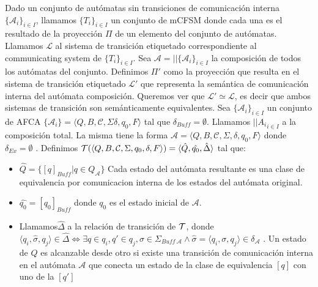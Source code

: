 \begin{definition}
Dado un conjunto de autómatas sin transiciones de comunicación interna $\{ \mathcal{A}_i\}_{i \in I}$, llamamos $\{T_i\}_{i \in I}$ un conjunto de mCFSM donde cada una es el resultado de la proyección $\Pi$ de un elemento del conjunto de autómatas. Llamamos $\mathcal{L}$ al sistema de transición etiquetado correspondiente al communicating system de $\{T_i\}_{i \in I}$. Sea $\mathcal{A} = || \{ \mathcal{A}_i\}_{i \in I}$ la composición de todos los autómatas del conjunto. Definimos $\Pi'$ como la proyección que resulta en el sistema de transición etiquetado $\mathcal{L}'$ que representa la semántica de comunicación interna del autómata composición.  Queremos ver que $\mathcal{L}' \simeq \mathcal{L}$, es decir que ambos sistemas de transición son semánticamente equivalentes.
Sea $\{ \mathcal{A}_i \}_{i \in I}$ un conjunto de AFCA $\{ \mathcal{A}_i \} = \langle Q, B, \mathcal{C}, \Sigma \delta, q_0, F \rangle$ tal que $\delta_{Buff} =  \emptyset$. Llamamos $||{A_i}_{i \in I}$ a la composición total. La misma tiene la forma $\mathcal{A} = \langle Q, B, \mathcal{C}, \Sigma, \delta, q_0, F \rangle$ donde $\delta_{Ex} = \emptyset$ . Definimos $\mathcal{T} (\langle Q, B, \mathcal{C}, \Sigma, q_0, \delta, F \rangle)= \langle \hat{Q}, \hat{q_0}, \hat{\Delta} \rangle$ tal que:
\begin{itemize}
    \item $ \hat{Q} = \{ [q]_{Buff}| q \in Q_{\mathcal{A}} \}$ Cada estado del autómata resultante es una clase de equivalencia por comunicacion interna de los estados del autómata original.
    \item $\hat{q_0} = [q_0]_{Buff}$ donde $q_0$ es el estado inicial de $\mathcal{A}$.
    \item Llamamos$\hat{\Delta}$ a la relación de transición de $\mathcal{T}$, donde $\langle q_i, \hat{\sigma}, q_j \rangle \in \hat{\Delta} \iff \exists q \in q_i, q' \in q_j, \sigma \in \Sigma_{Buff \ \mathcal{A}} \land \hat{\sigma} = \langle q_i, \sigma, q_j \rangle \in \delta_{\mathcal{A}}$  . Un estado de $\hat{Q}$ es alcanzable desde otro si existe una transición de comunicación interna en el autómata $\mathcal{A}$ que conecta un estado de la clase de equivalencia $[q]$ con uno de la $[q']$
    
\end{itemize}
\end{definition}


